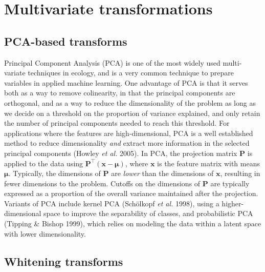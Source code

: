 \documentclass[
  letterpaper,
]{scrbook}
\begin{document}
\section{Multivariate
transformations}\label{multivariate-transformations}

\subsection{PCA-based transforms}\label{pca-based-transforms}

Principal Component Analysis (PCA) is one of the most widely used
multi-variate techniques in ecology, and is a very common technique to
prepare variables in applied machine learning. One advantage of PCA is
that it serves both as a way to remove colinearity, in that the
principal components are orthogonal, and as a way to reduce the
dimensionality of the problem as long as we decide on a threshold on the
proportion of variance explained, and only retain the number of
principal components needed to reach this threshold. For applications
where the features are high-dimensional, PCA is a well established
method to reduce dimensionality \emph{and} extract more information in
the selected principal components (Howley \emph{et al.} 2005). In PCA,
the projection matrix \(\mathbf{P}\) is applied to the data using
\(\mathbf{P}^\top(\mathbf{x}-\mathbf{\mu})\), where \(\mathbf{x}\) is
the feature matrix with means \(\mathbf{\mu}\). Typically, the
dimensions of \(\mathbf{P}\) are \emph{lower} than the dimensions of
\(\mathbf{x}\), resulting in fewer dimensions to the problem. Cutoffs on
the dimensions of \(\mathbf{P}\) are typically expressed as a proportion
of the overall variance maintained after the projection. Variants of PCA
include kernel PCA (Schölkopf \emph{et al.} 1998), using a
higher-dimensional space to improve the separability of classes, and
probabilistic PCA (Tipping \& Bishop 1999), which relies on modeling the
data within a latent space with lower dimensionality.

\subsection{Whitening transforms}\label{whitening-transforms}
\end{document}
